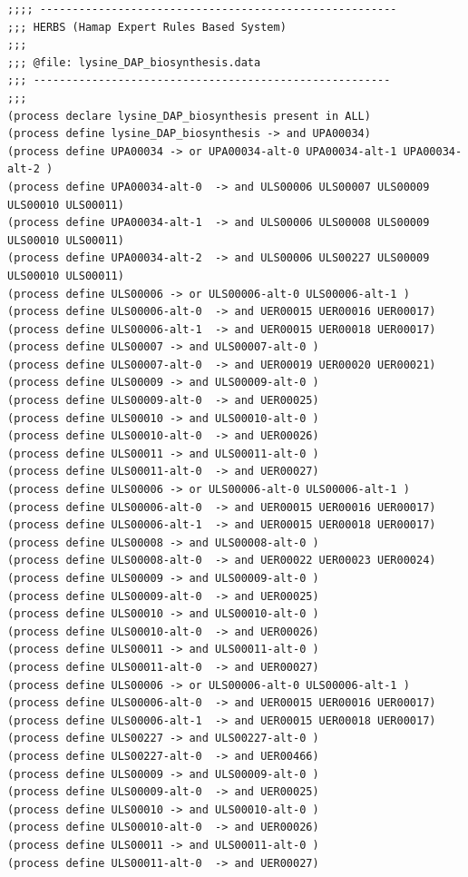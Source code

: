 \begin{lstlisting}[basicstyle=\tiny\normalfont\ttfamily,caption=data/processes/lysine\_DAP\_biosynthesis.data]
;;;; -------------------------------------------------------
;;; HERBS (Hamap Expert Rules Based System)
;;;
;;; @file: lysine_DAP_biosynthesis.data
;;; -------------------------------------------------------
;;;
(process declare lysine_DAP_biosynthesis present in ALL)
(process define lysine_DAP_biosynthesis -> and UPA00034)
(process define UPA00034 -> or UPA00034-alt-0 UPA00034-alt-1 UPA00034-alt-2 )
(process define UPA00034-alt-0  -> and ULS00006 ULS00007 ULS00009 ULS00010 ULS00011)
(process define UPA00034-alt-1  -> and ULS00006 ULS00008 ULS00009 ULS00010 ULS00011)
(process define UPA00034-alt-2  -> and ULS00006 ULS00227 ULS00009 ULS00010 ULS00011)
(process define ULS00006 -> or ULS00006-alt-0 ULS00006-alt-1 )
(process define ULS00006-alt-0  -> and UER00015 UER00016 UER00017)
(process define ULS00006-alt-1  -> and UER00015 UER00018 UER00017)
(process define ULS00007 -> and ULS00007-alt-0 )
(process define ULS00007-alt-0  -> and UER00019 UER00020 UER00021)
(process define ULS00009 -> and ULS00009-alt-0 )
(process define ULS00009-alt-0  -> and UER00025)
(process define ULS00010 -> and ULS00010-alt-0 )
(process define ULS00010-alt-0  -> and UER00026)
(process define ULS00011 -> and ULS00011-alt-0 )
(process define ULS00011-alt-0  -> and UER00027)
(process define ULS00006 -> or ULS00006-alt-0 ULS00006-alt-1 )
(process define ULS00006-alt-0  -> and UER00015 UER00016 UER00017)
(process define ULS00006-alt-1  -> and UER00015 UER00018 UER00017)
(process define ULS00008 -> and ULS00008-alt-0 )
(process define ULS00008-alt-0  -> and UER00022 UER00023 UER00024)
(process define ULS00009 -> and ULS00009-alt-0 )
(process define ULS00009-alt-0  -> and UER00025)
(process define ULS00010 -> and ULS00010-alt-0 )
(process define ULS00010-alt-0  -> and UER00026)
(process define ULS00011 -> and ULS00011-alt-0 )
(process define ULS00011-alt-0  -> and UER00027)
(process define ULS00006 -> or ULS00006-alt-0 ULS00006-alt-1 )
(process define ULS00006-alt-0  -> and UER00015 UER00016 UER00017)
(process define ULS00006-alt-1  -> and UER00015 UER00018 UER00017)
(process define ULS00227 -> and ULS00227-alt-0 )
(process define ULS00227-alt-0  -> and UER00466)
(process define ULS00009 -> and ULS00009-alt-0 )
(process define ULS00009-alt-0  -> and UER00025)
(process define ULS00010 -> and ULS00010-alt-0 )
(process define ULS00010-alt-0  -> and UER00026)
(process define ULS00011 -> and ULS00011-alt-0 )
(process define ULS00011-alt-0  -> and UER00027)
\end{lstlisting}



